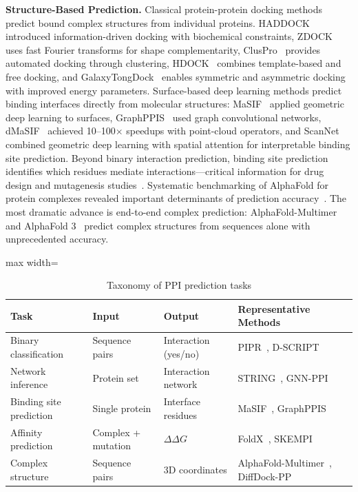 \textbf{Structure-Based Prediction.} Classical protein-protein docking methods predict bound complex structures from individual proteins. HADDOCK~\cite{dominguez2003haddock} introduced information-driven docking with biochemical constraints, ZDOCK~\cite{pierce2014zdock} uses fast Fourier transforms for shape complementarity, ClusPro~\cite{kozakov2017cluspro} provides automated docking through clustering, HDOCK~\cite{yan2020hdock} combines template-based and free docking, and GalaxyTongDock~\cite{baek2023galaxytongdock} enables symmetric and asymmetric docking with improved energy parameters. Surface-based deep learning methods predict binding interfaces directly from molecular structures: MaSIF~\cite{gainza2020masif} applied geometric deep learning to surfaces, GraphPPIS~\cite{cao2022graphppis} used graph convolutional networks, dMaSIF~\cite{sverrisson2021dmasif} achieved 10--100$\times$ speedups with point-cloud operators, and ScanNet~\cite{tubiana2022scanet} combined geometric deep learning with spatial attention for interpretable binding site prediction. Beyond binary interaction prediction, binding site prediction identifies which residues mediate interactions---critical information for drug design and mutagenesis studies~\cite{ortegon2020binding}. Systematic benchmarking of AlphaFold for protein complexes revealed important determinants of prediction accuracy~\cite{bryant2022benchmarking}. The most dramatic advance is end-to-end complex prediction: AlphaFold-Multimer~\cite{evans2022alphafoldmultimer} and AlphaFold 3~\cite{abramson2024alphafold3} predict complex structures from sequences alone with unprecedented accuracy.

\begin{table}[h]
\centering
\caption{Taxonomy of PPI prediction tasks}
\label{tab:ppi_tasks}
\small
\begin{adjustbox}{max width=\textwidth}
\begin{tabular}{@{}llll@{}}
\toprule
\textbf{Task} & \textbf{Input} & \textbf{Output} & \textbf{Representative Methods} \\
\midrule
Binary classification & Sequence pairs & Interaction (yes/no) & PIPR~\cite{chen2019pipr}, D-SCRIPT~\cite{sledzieski2021dscript} \\
Network inference & Protein set & Interaction network & STRING~\cite{szklarczyk2021string}, GNN-PPI~\cite{lv2021gnnppi} \\
Binding site prediction & Single protein & Interface residues & MaSIF~\cite{gainza2020masif}, GraphPPIS~\cite{cao2022graphppis} \\
Affinity prediction & Complex + mutation & $\Delta\Delta G$ & FoldX~\cite{guerois2005foldx}, SKEMPI~\cite{jankauskaite2019skempi2} \\
Complex structure & Sequence pairs & 3D coordinates & AlphaFold-Multimer~\cite{evans2022alphafoldmultimer}, DiffDock-PP~\cite{ketata2023diffdockpp} \\
\bottomrule
\end{tabular}
\end{adjustbox}
\end{table}

